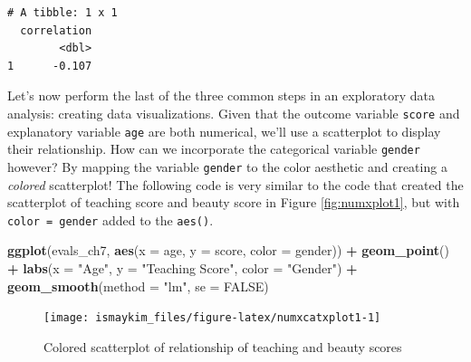 \documentclass[12pt, krantz2,]{krantz}
\makeatletter
\newenvironment{Shaded}{\begin{snugshade}}{\end{snugshade}}
\newcommand{\DataTypeTok}[1]{\textcolor[rgb]{0.27,0.27,0.27}{#1}}
\newcommand{\KeywordTok}[1]{\textcolor[rgb]{0.27,0.27,0.27}{\textbf{#1}}}
\newcommand{\NormalTok}[1]{#1}
\newcommand{\OperatorTok}[1]{\textcolor[rgb]{0.43,0.43,0.43}{\textbf{#1}}}
\newcommand{\OtherTok}[1]{\textcolor[rgb]{0.37,0.37,0.37}{#1}}
\newcommand{\StringTok}[1]{\textcolor[rgb]{0.5,0.5,0.5}{#1}}
\newenvironment{kframe}{%
\medskip{}
\setlength{\fboxsep}{.8em}
 \def\at@end@of@kframe{}%
 \ifinner\ifhmode%
  \def\at@end@of@kframe{\end{minipage}}%
  \begin{minipage}{\columnwidth}%
 \fi\fi%
 \def\FrameCommand##1{\hskip\@totalleftmargin \hskip-\fboxsep
 \colorbox{shadecolor}{##1}\hskip-\fboxsep
     \hskip-\linewidth \hskip-\@totalleftmargin \hskip\columnwidth}%
 \MakeFramed {\advance\hsize-\width
   \@totalleftmargin\z@ \linewidth\hsize
   \@setminipage}}%
 {\par\unskip\endMakeFramed%
 \at@end@of@kframe}
\renewenvironment{Shaded}{\begin{kframe}}{\end{kframe}}
\makeatother
\begin{document}
\begin{Shaded}
\end{Shaded}

\begin{verbatim}
# A tibble: 1 x 1
  correlation
        <dbl>
1      -0.107
\end{verbatim}

Let's now perform the last of the three common steps in an exploratory data analysis: creating data visualizations. Given that the outcome variable \texttt{score} and explanatory variable \texttt{age} are both numerical, we'll use a scatterplot to display their relationship. How can we incorporate the categorical variable \texttt{gender} however? By mapping the variable \texttt{gender} to the color aesthetic and creating a \emph{colored} scatterplot! The following code is very similar to the code that created the scatterplot of teaching score and beauty score in Figure \ref{fig:numxplot1}, but with \texttt{color\ =\ gender} added to the \texttt{aes()}.

\begin{Shaded}
\begin{Highlighting}[]
\KeywordTok{ggplot}\NormalTok{(evals_ch7, }\KeywordTok{aes}\NormalTok{(}\DataTypeTok{x =}\NormalTok{ age, }\DataTypeTok{y =}\NormalTok{ score, }\DataTypeTok{color =}\NormalTok{ gender)) }\OperatorTok{+}
\StringTok{  }\KeywordTok{geom_point}\NormalTok{() }\OperatorTok{+}
\StringTok{  }\KeywordTok{labs}\NormalTok{(}\DataTypeTok{x =} \StringTok{"Age"}\NormalTok{, }\DataTypeTok{y =} \StringTok{"Teaching Score"}\NormalTok{, }\DataTypeTok{color =} \StringTok{"Gender"}\NormalTok{) }\OperatorTok{+}
\StringTok{  }\KeywordTok{geom_smooth}\NormalTok{(}\DataTypeTok{method =} \StringTok{"lm"}\NormalTok{, }\DataTypeTok{se =} \OtherTok{FALSE}\NormalTok{)}
\end{Highlighting}
\end{Shaded}

\begin{figure}

{\centering \texttt{[image: ismaykim\_files/figure-latex/numxcatxplot1-1]} 

}

\caption{Colored scatterplot of relationship of teaching and beauty scores}\label{fig:numxcatxplot1}
\end{figure}
\end{document}
